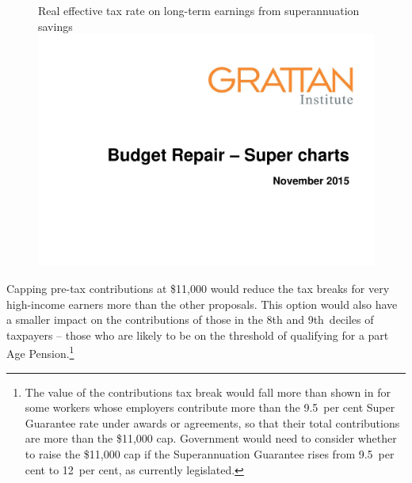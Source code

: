 \begin{figure}
%
{Real effective tax rate on long-term earnings from superannuation savings}\label{fig:SUPER-4-9}
\includegraphics[width=\columnwidth,page=27]{super-atlas/PPTX.pdf}
\end{figure}

Capping pre-tax contributions at \$11,000 would reduce the tax breaks for very high-income earners more than the other proposals. This option would also have a smaller impact on the contributions of those in the 8th and 9th~deciles of taxpayers – those who are likely to be on the threshold of qualifying for a part Age Pension.\footnote{The value of the contributions tax break would fall more than shown in  for some workers whose employers contribute more than the 9.5~per cent Super Guarantee rate under awards or agreements, so that their total contributions are more than the \$11,000 cap. Government would need to consider whether to raise the \$11,000 cap if the Superannuation Guarantee rises from 9.5~per cent to 12~per cent, as currently legislated.} 

